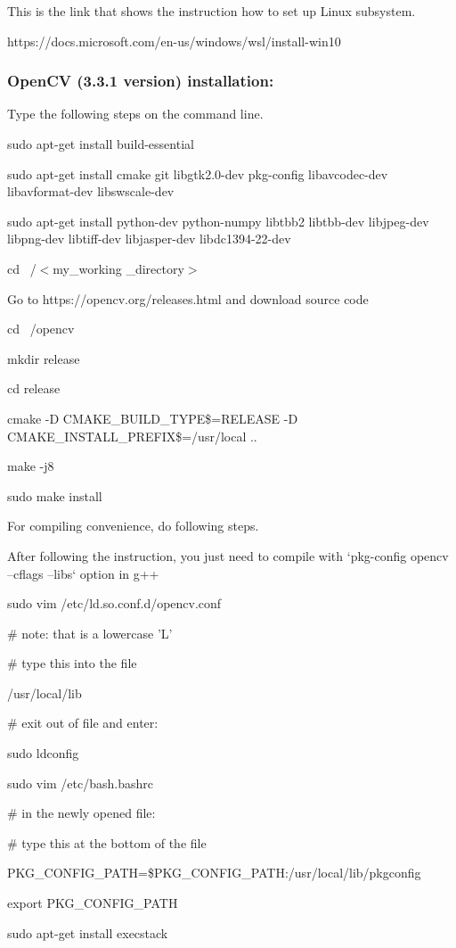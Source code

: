 \documentclass[article, onecolumn, draftclsnofoot,10pt, compsoc]{IEEEtran}
\begin{document}
This is the link that shows the instruction how to set up Linux subsystem.

https://docs.microsoft.com/en-us/windows/wsl/install-win10

\subsubsection{OpenCV (3.3.1 version) installation:}

Type the following steps on the command line.

sudo apt-get install build-essential

sudo apt-get install cmake git libgtk2.0-dev pkg-config libavcodec-dev libavformat-dev libswscale-dev

sudo apt-get install python-dev python-numpy libtbb2 libtbb-dev libjpeg-dev libpng-dev libtiff-dev libjasper-dev libdc1394-22-dev

cd ~/$<$my\_working \_directory$>$

Go to https://opencv.org/releases.html and download source code

cd ~/opencv

mkdir release

cd release

cmake -D CMAKE\_BUILD\_TYPE\$=RELEASE -D CMAKE\_INSTALL\_PREFIX\$=/usr/local ..

make -j8

sudo make install

For compiling convenience, do following steps.

After following the instruction, you just need to compile with `pkg-config opencv --cflags --libs` option in g++

sudo vim /etc/ld.so.conf.d/opencv.conf

	\# note: that is a lowercase 'L'

\# type this into the file

/usr/local/lib

\# exit out of file and enter:

sudo ldconfig

sudo vim /etc/bash.bashrc

\# in the newly opened file:

\# type this at the bottom of the file

PKG\_CONFIG\_PATH=\$PKG\_CONFIG\_PATH:/usr/local/lib/pkgconfig

export PKG\_CONFIG\_PATH

sudo apt-get install execstack
\end{document}
